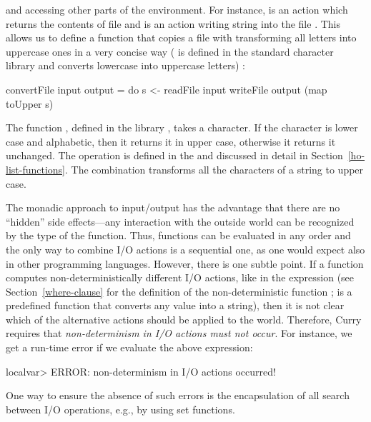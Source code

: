 and accessing other parts of the environment.
For instance, 
is an action which returns the contents
of file  and 
is an action writing string
 into the file . This allows us to define a function
that copies a file with transforming all letters into uppercase ones
in a very concise way (
is defined in the standard character library  and converts
lowercase into uppercase letters)
:
\begin{prog}
convertFile input output = do
  s <- readFile input
  writeFile output (map toUpper s)
\end{prog}
%
% 
The function , defined in the library ,
takes a character. If the character is lower case and alphabetic,
then it returns it in upper case, otherwise it returns it unchanged.
The operation  is defined in the 
and discussed in detail in Section~\ref{ho-list-functions}.
The combination  transforms all the characters
of a string to upper case.

The monadic approach to input/output has the advantage
that there are no ``hidden'' side effects---any interaction
with the outside world can be recognized by the  type of the
function. Thus, functions can be evaluated in any order
and the only way to combine I/O actions is a sequential one, as
one would expect also in other programming languages.
However, there is one subtle point. If a function computes
non-deterministically different I/O actions,
like in the expression 
(see Section~\ref{where-clause} for the definition
of the non-deterministic function ;
 is a predefined function that
converts any value into a string),
then it is not clear which of the alternative actions
should be applied to the world. Therefore, Curry requires
that \emph{non-determinism in I/O actions must not occur}.
For instance, we get a run-time error if we evaluate the
above expression:
\begin{prog}
localvar> 
ERROR: non-determinism in I/O actions occurred!
\end{prog}
%
One way to ensure the absence of such errors is the
encapsulation of all search between I/O operations, e.g.,
by using set functions.

